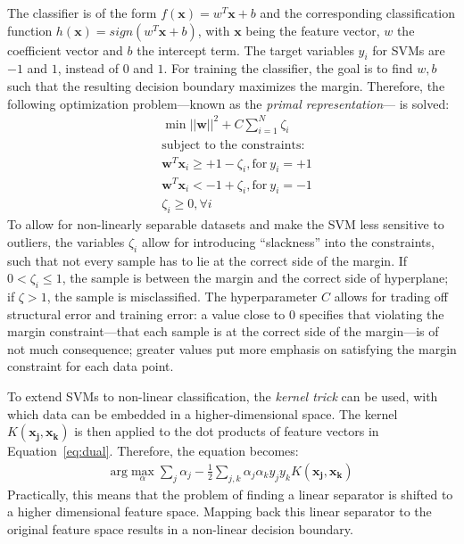 \documentclass[a4paper]{article}
\begin{document}
The classifier is of the form $f(\mathbf{x}) = w^T\mathbf{x} + b$ and
the corresponding classification function
$h(\mathbf{x}) = sign(w^T\mathbf{x} + b)$, with $\mathbf{x}$ being the
feature vector, $w$ the coefficient vector and $b$ the intercept
term. The target variables $y_i$ for SVMs are $-1$ and $1$, instead of
$0$ and $1$. For training the classifier, the goal is to find $w, b$
such that the resulting decision boundary maximizes the margin.
Therefore, the following optimization problem---known as the
\emph{primal representation}--- is solved:
\begin{align}
  & \min ||\mathbf{w}||^2 + C \sum_{i = 1}^N\zeta_i\\
  & \text{subject to the constraints:}\\
 & \mathbf{w}^T\mathbf{x}_i \geq + 1-\zeta_i, \text{for}~y_i =
  +1\\
 & \mathbf{w}^T\mathbf{x}_i <-1+\zeta_i, \text{for}~y_i =
  -1\\
& \zeta_i \geq 0, \forall i
\end{align}
To allow for non-linearly separable datasets and make the SVM less
sensitive to outliers, the variables $\zeta_i$ allow for introducing
``slackness'' into the constraints, such that not every sample has to
lie at the correct side of the margin. If $0 < \zeta_i \leq 1$, the
sample is between the margin and the correct side of hyperplane; if
$\zeta > 1$, the sample is misclassified. The hyperparameter $C$
allows for trading off structural error and training error: a value
close to 0 specifies that violating the margin constraint---that each
sample is at the correct side of the margin---is of not much
consequence; greater values put more emphasis on satisfying the margin
constraint for each data point.

To extend SVMs to non-linear classification, the \emph{kernel trick}
can be used, with which data can be embedded in a higher-dimensional
space. The kernel $K(\mathbf{x_j}, \mathbf{x_k})$ is then applied to
the dot products of feature vectors in
Equation~\ref{eq:dual}. Therefore, the equation becomes:
\begin{align}
\label{eq:dualkernel}
  \text{arg}\max_\alpha\sum_j\alpha_j - \frac{1}{2}\sum_{j,k}\alpha_j\alpha_ky_jy_kK(\mathbf{x_j}, \mathbf{x_k})
\end{align} 
Practically, this means that the problem of finding a linear separator
is shifted to a higher dimensional feature space. Mapping back this
linear separator to the original feature space results in a non-linear
decision boundary.
\end{document}
